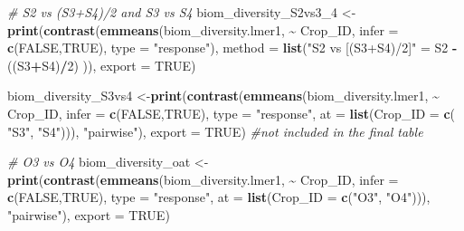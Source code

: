 \documentclass[
]{article}
\newenvironment{Shaded}{\begin{snugshade}}{\end{snugshade}}
\newcommand{\AttributeTok}[1]{\textcolor[rgb]{0.13,0.29,0.53}{#1}}
\newcommand{\CommentTok}[1]{\textcolor[rgb]{0.56,0.35,0.01}{\textit{#1}}}
\newcommand{\ConstantTok}[1]{\textcolor[rgb]{0.56,0.35,0.01}{#1}}
\newcommand{\DecValTok}[1]{\textcolor[rgb]{0.00,0.00,0.81}{#1}}
\newcommand{\FunctionTok}[1]{\textcolor[rgb]{0.13,0.29,0.53}{\textbf{#1}}}
\newcommand{\NormalTok}[1]{#1}
\newcommand{\OtherTok}[1]{\textcolor[rgb]{0.56,0.35,0.01}{#1}}
\newcommand{\SpecialCharTok}[1]{\textcolor[rgb]{0.81,0.36,0.00}{\textbf{#1}}}
\newcommand{\StringTok}[1]{\textcolor[rgb]{0.31,0.60,0.02}{#1}}
\begin{document}
\begin{Shaded}
\begin{Highlighting}[]
\CommentTok{\# S2 vs (S3+S4)/2 and S3 vs S4}
\NormalTok{biom\_diversity\_S2vs3\_4 }\OtherTok{\textless{}{-}} \FunctionTok{print}\NormalTok{(}\FunctionTok{contrast}\NormalTok{(}\FunctionTok{emmeans}\NormalTok{(biom\_diversity.lmer1, }\SpecialCharTok{\textasciitilde{}}\NormalTok{ Crop\_ID,}
                                                 \AttributeTok{infer =} \FunctionTok{c}\NormalTok{(}\ConstantTok{FALSE}\NormalTok{,}\ConstantTok{TRUE}\NormalTok{), }
                                                 \AttributeTok{type =} \StringTok{"response"}\NormalTok{),}
                                         \AttributeTok{method =} \FunctionTok{list}\NormalTok{(}\StringTok{"S2 vs [(S3+S4)/2]"} \OtherTok{=}\NormalTok{ S2 }\SpecialCharTok{{-}}\NormalTok{ ((S3}\SpecialCharTok{+}\NormalTok{S4)}\SpecialCharTok{/}\DecValTok{2}\NormalTok{) )),}
                                \AttributeTok{export =} \ConstantTok{TRUE}\NormalTok{)}

\NormalTok{biom\_diversity\_S3vs4 }\OtherTok{\textless{}{-}}\FunctionTok{print}\NormalTok{(}\FunctionTok{contrast}\NormalTok{(}\FunctionTok{emmeans}\NormalTok{(biom\_diversity.lmer1, }\SpecialCharTok{\textasciitilde{}}\NormalTok{ Crop\_ID, }
                                              \AttributeTok{infer =} \FunctionTok{c}\NormalTok{(}\ConstantTok{FALSE}\NormalTok{,}\ConstantTok{TRUE}\NormalTok{), }
                                              \AttributeTok{type =} \StringTok{"response"}\NormalTok{, }
                                              \AttributeTok{at =} \FunctionTok{list}\NormalTok{(}\AttributeTok{Crop\_ID =} \FunctionTok{c}\NormalTok{( }\StringTok{"S3"}\NormalTok{, }\StringTok{"S4"}\NormalTok{))), }\StringTok{"pairwise"}\NormalTok{),}
                             \AttributeTok{export =} \ConstantTok{TRUE}\NormalTok{) }\CommentTok{\#not included in the final table}


\CommentTok{\# O3 vs O4}
\NormalTok{biom\_diversity\_oat }\OtherTok{\textless{}{-}} \FunctionTok{print}\NormalTok{(}\FunctionTok{contrast}\NormalTok{(}\FunctionTok{emmeans}\NormalTok{(biom\_diversity.lmer1, }\SpecialCharTok{\textasciitilde{}}\NormalTok{ Crop\_ID,}
                                             \AttributeTok{infer =} \FunctionTok{c}\NormalTok{(}\ConstantTok{FALSE}\NormalTok{,}\ConstantTok{TRUE}\NormalTok{),}
                                             \AttributeTok{type =} \StringTok{"response"}\NormalTok{, }
                                             \AttributeTok{at =} \FunctionTok{list}\NormalTok{(}\AttributeTok{Crop\_ID =} \FunctionTok{c}\NormalTok{(}\StringTok{"O3"}\NormalTok{, }\StringTok{"O4"}\NormalTok{))), }\StringTok{"pairwise"}\NormalTok{),}
                            \AttributeTok{export =} \ConstantTok{TRUE}\NormalTok{)}


\end{Highlighting}
\end{Shaded}
\end{document}
